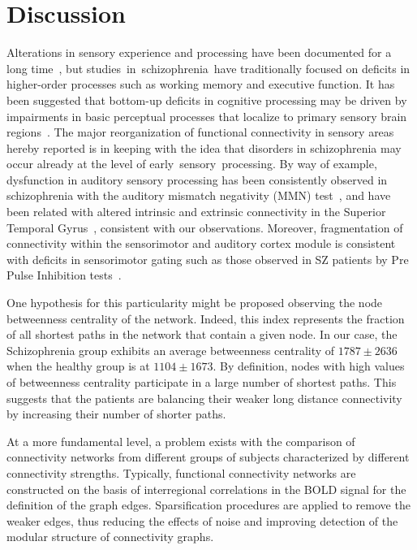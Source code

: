 \section{Discussion}
Alterations in sensory experience and processing have been documented for a long time~\cite{bleuler1911,mcghie1961}, but studies in schizophrenia have traditionally focused on deficits in higher-order processes such as working memory and executive function.
It has been suggested that bottom-up deficits in cognitive processing may be driven by impairments in basic perceptual processes that localize to primary sensory brain regions~\cite{javitt2009,javitt2009a}.
The major reorganization of functional connectivity in sensory areas hereby reported is in keeping with the idea that disorders in schizophrenia may occur already at the level of early sensory processing.
By way of example, dysfunction in auditory sensory processing has been consistently observed in schizophrenia with the auditory mismatch negativity (MMN) test~\cite{javitt2015}, and have been related with altered intrinsic and extrinsic connectivity in the Superior Temporal Gyrus~\cite{garrido2008}, consistent with our observations.
Moreover, fragmentation of connectivity within the sensorimotor and auditory cortex module is consistent with deficits in sensorimotor gating such as those observed in SZ patients by Pre Pulse Inhibition tests~\cite{braff1990}.

One hypothesis for this particularity might be proposed observing the node betweenness centrality of the network.
Indeed, this index represents the fraction of all shortest paths in the network that contain a given node.
In our case, the Schizophrenia group exhibits an average betweenness centrality of $1787\pm 2636$ when the healthy group is at $1104 \pm 1673$.
By definition, nodes with high values of betweenness centrality participate in a large number of shortest paths.
This suggests that the patients are balancing their weaker long distance connectivity by increasing their number of shorter paths.

At a more fundamental level, a problem exists with the comparison of connectivity networks from different groups of subjects characterized by different connectivity strengths.
Typically, functional connectivity networks are constructed on the basis of interregional correlations in the BOLD signal for the definition of the graph edges.
Sparsification procedures are applied to remove the weaker edges, thus reducing the effects of noise and improving detection of the modular structure of connectivity graphs.


